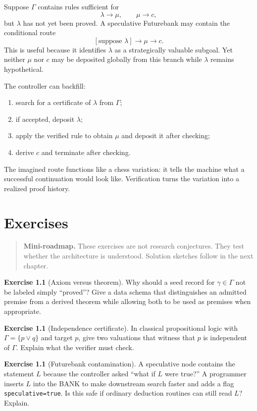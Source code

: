 \documentclass[11pt,openany]{book}
\theoremstyle{definition}
\newtheorem{exercise}[theorem]{Exercise}
\theoremstyle{remark}
\newenvironment{miniroadmap}{\begin{quote}\small\color{deepblue}\textbf{Mini-roadmap.} }{\end{quote}}
\begin{document}
Suppose $\Gamma$ contains rules sufficient for
\[
\lambda\to\mu,\qquad \mu\to c,
\]
but $\lambda$ has not yet been proved. A speculative Futurebank may contain the conditional route
\[
[\text{suppose }\lambda]\to\mu\to c.
\]
This is useful because it identifies $\lambda$ as a strategically valuable subgoal. Yet neither $\mu$ nor $c$ may be deposited globally from this branch while $\lambda$ remains hypothetical.

The controller can backfill:
\begin{enumerate}
\item search for a certificate of $\lambda$ from $\Gamma$;
\item if accepted, deposit $\lambda$;
\item apply the verified rule to obtain $\mu$ and deposit it after checking;
\item derive $c$ and terminate after checking.
\end{enumerate}
The imagined route functions like a chess variation: it tells the machine what a successful continuation would look like. Verification turns the variation into a realized proof history.

\chapter{Exercises}
\begin{miniroadmap}
These exercises are not research conjectures. They test whether the architecture is understood. Solution sketches follow in the next chapter.
\end{miniroadmap}

\begin{exercise}[Axiom versus theorem]\label{ex:axthm}
Why should a seed record for $\gamma\in\Gamma$ not be labeled simply ``proved''? Give a data schema that distinguishes an admitted premise from a derived theorem while allowing both to be used as premises when appropriate.
\end{exercise}

\begin{exercise}[Independence certificate]\label{ex:indcert}
In classical propositional logic with $\Gamma=\{p\lor q\}$ and target $p$, give two valuations that witness that $p$ is independent of $\Gamma$. Explain what the verifier must check.
\end{exercise}

\begin{exercise}[Futurebank contamination]\label{ex:contam}
A speculative node contains the statement $L$ because the controller asked ``what if $L$ were true?'' A programmer inserts $L$ into the BANK to make downstream search faster and adds a flag \texttt{speculative=true}. Is this safe if ordinary deduction routines can still read $L$? Explain.
\end{exercise}
\end{document}
